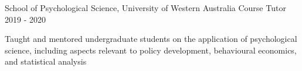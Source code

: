 \begin{cventries}
  \cventry
    {School of Psychological Science, University of Western Australia} %
    {Course Tutor} %
    {}%
    {2019 - 2020} %
    { %
      \begin{cvitems}
        \item Taught and mentored undergraduate students on the application of psychological science, including aspects relevant to policy development, behavioural economics, and statistical analysis
      \end{cvitems}
    }
    
\end{cventries}

